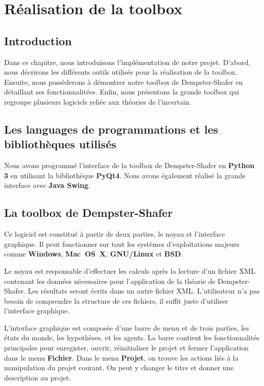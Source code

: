 \chapter{Réalisation de la toolbox}

\section{Introduction}

Dans ce chapitre, nous introduisons l'implémentation de notre projet. D'abord, nous 
décrirons les différents outils utilisés pour la réalisation de la toolbox. Ensuite,
nous possèderons à démontrer notre toolbox de Dempster-Shafer en détaillant ses
fonctionnalitées. Enfin, nous présentons la grande toolbox qui regroupe plusieurs
logiciels reliée aux théories de l'incertain.

\section{Les languages de programmations et les bibliothèques utilisés}

Nous avons programmé l'interface de la toolbox de Dempster-Shafer en \textbf{Python 3}
en utilisant la bibliothèque \textbf{PyQt4}. Nous avons également réalisé la grande
interface avec \textbf{Java Swing}.

\section{La toolbox de Dempster-Shafer}

Ce logiciel est constitué à partir de deux parties, le noyau et l'interface graphique.
Il peut fonctionner sur tout les systèmes d'exploitations majeurs comme \textbf{Windows},
\textbf{Mac~OS~X}, \textbf{GNU/Linux} et \textbf{BSD}.

Le noyau est responsable d'effectuer les calculs après la lecture d'un fichier XML
contenant les données nécessaires pour l'application de la théorie de Dempster-Shafer.
Les résultats seront écrits dans un autre fichier XML. L'utilisateur n'a pas besoin
de comprendre la structure de ces fichiers, il suffit juste d'utiliser l'interface
graphique.

L'interface graphique est composée d'une barre de menu et de trois parties, les états
du monde, les hypothèses, et les agents. La barre contient les fonctionnalités principales
pour enregister, ouvrir, réinitialiser le projet et fermer l'application dans le menu
\textbf{Fichier}. Dans le menu \textbf{Projet}, on trouve les actions liés à la manipulation
du projet courant. On peut y changer le titre et donner une description au projet. 

